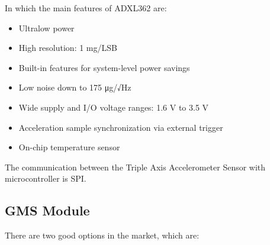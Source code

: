 \documentclass[10pt,journal,compsoc]{IEEEtran}
\begin{document}
\hfil

In which the main features of ADXL362 are:

\begin{itemize}
  \item Ultralow power
  \item High resolution: 1 mg/LSB
  \item Built-in features for system-level power savings
  \item Low noise down to 175 μg/√Hz
  \item Wide supply and I/O voltage ranges: 1.6 V to 3.5 V
  \item Acceleration sample synchronization via external trigger
  \item On-chip temperature sensor
\end{itemize}

\hfil

The communication between the Triple Axis Accelerometer Sensor with microcontroller is SPI.

\hfil

\subsection{GMS Module}

There are two good options in the market, which are:
\end{document}
